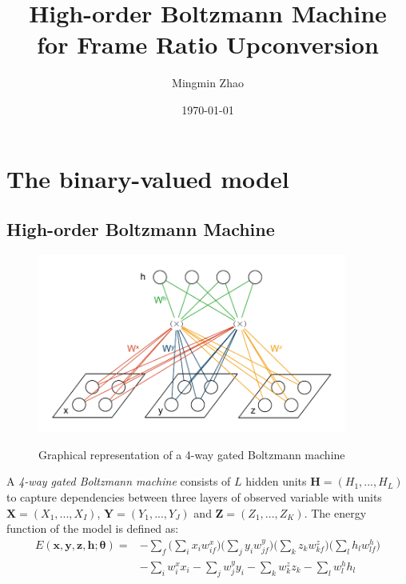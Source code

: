 \documentclass{article}
\begin{document}
\title{\textbf{High-order Boltzmann Machine \\for Frame Ratio Upconversion}}
\author{Mingmin Zhao}

\date{\today}
\maketitle


\section{The binary-valued model}

\subsection{High-order Boltzmann Machine}

\begin{figure}
  \centering
  \includegraphics[width=4in]{4GRBM}\\
  \caption{Graphical representation of a 4-way gated Boltzmann machine}\label{4GRBM}
\end{figure}

A \textit{4-way gated Boltzmann machine} consists of $L$ hidden units $\boldsymbol{H} = (H_1, ..., H_L)$ to capture dependencies between three layers of observed variable with units $\boldsymbol{X} = (X_1, ..., X_I)$, $\boldsymbol{Y} = (Y_1, ..., Y_J)$ and $\boldsymbol{Z} = (Z_1, ..., Z_K)$.
The energy function of the model is defined as:
\begin{equation}
\begin{split}
E(\boldsymbol{x},\boldsymbol{y},\boldsymbol{z},\boldsymbol{h};\boldsymbol{\theta}) = &-\sum_f{\bigg(\sum_i{x_i w_{if}^x}\bigg) \bigg(\sum_j{y_i w_{jf}^y}\bigg) \bigg(\sum_k{z_k w_{kf}^z}\bigg) \bigg(\sum_l{h_l w_{lf}^h}\bigg)}
\\
&- \sum_i{w_{i}^x x_i} - \sum_j{w_{j}^y y_i} - \sum_k{w_{k}^z z_k} - \sum_l{w_{l}^h h_l}
\end{split}
\end{equation}
\end{document}
